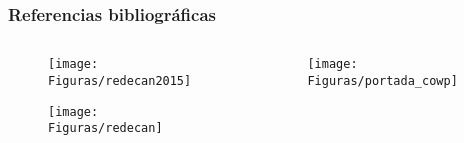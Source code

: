 \documentclass{beamer}
\begin{document}

\begin{frame}\frametitle{Referencias bibliográficas}

\vspace{-10pt}
\begin{columns}
	\begin{column}{0.5\textwidth}
		\begin{figure}
				\centering
				\texttt{[image: Figuras/redecan2015]}
			\end{figure}
			\begin{figure}
				\raggedright
				\texttt{[image: Figuras/redecan]}
			\end{figure}
	\end{column}
	\begin{column}{0.5\textwidth}
		\begin{figure}
			\centering
			\texttt{[image: Figuras/portada\_cowp]}
		\end{figure}
	\end{column}

\end{columns}

\end{frame}


\end{document}
